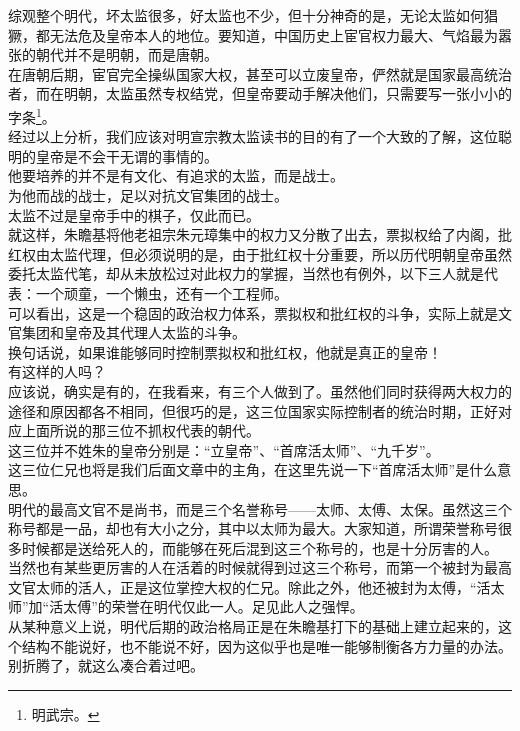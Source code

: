 \begin{multicols}{\theparacolNo}
综观整个明代，坏太监很多，好太监也不少，但十分神奇的是，无论太监如何猖獗，都无法危及皇帝本人的地位。要知道，中国历史上宦官权力最大、气焰最为嚣张的朝代并不是明朝，而是唐朝。\\

在唐朝后期，宦官完全操纵国家大权，甚至可以立废皇帝，俨然就是国家最高统治者，而在明朝，太监虽然专权结党，但皇帝要动手解决他们，只需要写一张小小的字条\footnote{明武宗。}。\\

经过以上分析，我们应该对明宣宗教太监读书的目的有了一个大致的了解，这位聪明的皇帝是不会干无谓的事情的。\\

他要培养的并不是有文化、有追求的太监，而是战士。\\

为他而战的战士，足以对抗文官集团的战士。\\

太监不过是皇帝手中的棋子，仅此而已。\\

就这样，朱瞻基将他老祖宗朱元璋集中的权力又分散了出去，票拟权给了内阁，批红权由太监代理，但必须说明的是，由于批红权十分重要，所以历代明朝皇帝虽然委托太监代笔，却从未放松过对此权力的掌握，当然也有例外，以下三人就是代表：一个顽童，一个懒虫，还有一个工程师。\\

可以看出，这是一个稳固的政治权力体系，票拟权和批红权的斗争，实际上就是文官集团和皇帝及其代理人太监的斗争。\\

换句话说，如果谁能够同时控制票拟权和批红权，他就是真正的皇帝！\\

有这样的人吗？\\

应该说，确实是有的，在我看来，有三个人做到了。虽然他们同时获得两大权力的途径和原因都各不相同，但很巧的是，这三位国家实际控制者的统治时期，正好对应上面所说的那三位不抓权代表的朝代。\\

这三位并不姓朱的皇帝分别是：“立皇帝”、“首席活太师”、“九千岁”。\\

这三位仁兄也将是我们后面文章中的主角，在这里先说一下“首席活太师”是什么意思。\\

明代的最高文官不是尚书，而是三个名誉称号——太师、太傅、太保。虽然这三个称号都是一品，却也有大小之分，其中以太师为最大。大家知道，所谓荣誉称号很多时候都是送给死人的，而能够在死后混到这三个称号的，也是十分厉害的人。\\

当然也有某些更厉害的人在活着的时候就得到过这三个称号，而第一个被封为最高文官太师的活人，正是这位掌控大权的仁兄。除此之外，他还被封为太傅，“活太师”加“活太傅”的荣誉在明代仅此一人。足见此人之强悍。\\

从某种意义上说，明代后期的政治格局正是在朱瞻基打下的基础上建立起来的，这个结构不能说好，也不能说不好，因为这似乎也是唯一能够制衡各方力量的办法。\\

别折腾了，就这么凑合着过吧。\\
\ifnum{}
	\end{multicols}
